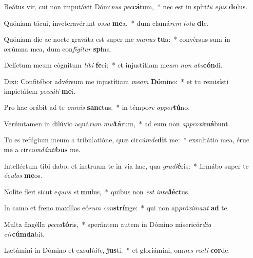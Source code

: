 \item Beátus vir, cui non imputávit Dómi\textit{nus} \textit{pec}\textbf{cá}tum,~* nec est in spíri\textit{tu} \textit{e}\textit{jus} \textbf{do}lus.
\item Quóniam tácui, inveteravérunt \textit{os}\textit{sa} \textbf{me}a,~* dum clamá\textit{rem} \textit{to}\textit{ta} \textbf{di}e.
\item Quóniam die ac nocte graváta est super me \textit{ma}\textit{nus} \textbf{tu}a:~* convérsus sum in ærúmna mea, dum con\textit{fí}\textit{gi}\textit{tur} \textbf{spi}na.
\item Delíctum meum cógnitum \textit{ti}\textit{bi} \textbf{fe}ci:~* et injustítiam me\textit{am} \textit{non} \textit{abs}\textbf{cón}di.
\item Dixi: Confitébor advérsum me injustítiam \textit{me}\textit{am} \textbf{Dó}mino:~* et tu remisísti impietátem \textit{pec}\textit{cá}\textit{ti} \textbf{me}i.
\item Pro hac orábit ad te \textit{om}\textit{nis} \textbf{sanc}tus,~* in témpo\textit{re} \textit{op}\textit{por}\textbf{tú}no.
\item Verúmtamen in dilúvio aquá\textit{rum} \textit{mul}\textbf{tá}rum,~* ad eum non \textit{ap}\textit{pro}\textit{xi}\textbf{má}bunt.
\item Tu es refúgium meum a tribulatióne, quæ cir\textit{cúm}\textit{de}\textbf{dit} me:~* exsultátio mea, érue me a cir\textit{cum}\textit{dán}\textit{ti}\textbf{bus} me.
\item Intelléctum tibi dabo, et ínstruam te in via hac, qua \textit{gra}\textit{di}\textbf{é}ris:~* firmábo super te \textit{ó}\textit{cu}\textit{los} \textbf{me}os.
\item Nolíte fíeri sicut e\textit{quus} \textit{et} \textbf{mu}lus,~* quibus non \textit{est} \textit{in}\textit{tel}\textbf{léc}tus.
\item In camo et freno maxíllas eó\textit{rum} \textit{con}\textbf{strín}ge:~* qui non ap\textit{pró}\textit{xi}\textit{mant} \textbf{ad} te.
\item Multa flagélla \textit{pec}\textit{ca}\textbf{tó}ris,~* sperántem autem in Dómino misericór\textit{di}\textit{a} \textit{cir}\textbf{cúm}\textbf{da}bit.
\item Lætámini in Dómino et exsul\textit{tá}\textit{te}, \textbf{jus}ti,~* et gloriámini, om\textit{nes} \textit{rec}\textit{ti} \textbf{cor}de.
